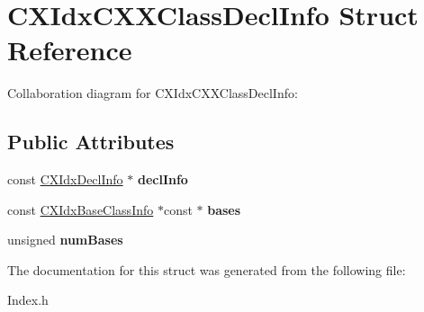 \hypertarget{structCXIdxCXXClassDeclInfo}{}\section{C\+X\+Idx\+C\+X\+X\+Class\+Decl\+Info Struct Reference}
\label{structCXIdxCXXClassDeclInfo}


Collaboration diagram for C\+X\+Idx\+C\+X\+X\+Class\+Decl\+Info\+:
\subsection*{Public Attributes}
\begin{DoxyCompactItemize}
\item 
\mbox{\label{structCXIdxCXXClassDeclInfo_a49187f6aa7bcf00343662721d806d553}} 
const \hyperlink{structCXIdxDeclInfo}{C\+X\+Idx\+Decl\+Info} $\ast$ {\bfseries decl\+Info}
\item 
\mbox{\label{structCXIdxCXXClassDeclInfo_ab143f312c0fe82e44ad9fb58ffe66f35}} 
const \hyperlink{structCXIdxBaseClassInfo}{C\+X\+Idx\+Base\+Class\+Info} $\ast$const  $\ast$ {\bfseries bases}
\item 
\mbox{\label{structCXIdxCXXClassDeclInfo_ac8b3da9564378790fc398dc02b33e301}} 
unsigned {\bfseries num\+Bases}
\end{DoxyCompactItemize}


The documentation for this struct was generated from the following file\+:\begin{DoxyCompactItemize}
\item 
Index.\+h\end{DoxyCompactItemize}
